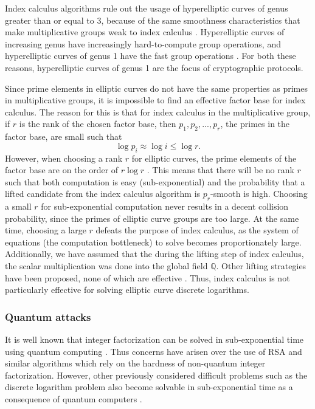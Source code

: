 \documentclass{article}
\begin{document}
    Index calculus algorithms rule out the usage of hyperelliptic curves of
    genus greater than or equal to 3, because of the same smoothness
    characteristics that make multiplicative groups weak to index calculus
    \cite{Theriault2003} \cite{Gaudry2000}. Hyperelliptic curves of increasing
    genus have increasingly hard-to-compute group operations, and hyperelliptic
    curves of genus 1 have the fast group operations \cite{Costello2012}. For
    both these reasons, hyperelliptic curves of genus 1 are the focus of
    cryptographic protocols.

    Since prime elements in elliptic curves do not have the same properties as
    primes in multiplicative groups, it is impossible to find an effective
    factor base for index calculus. The reason for this is that for index
    calculus in the multiplicative group, if $r$ is the rank of the chosen
    factor base, then $p_1, p_2, ..., p_r$, the primes in the factor base, are
    small such that
    \begin{equation}
        \log{p_i} \approx \log{i} \le \log{r}.
    \end{equation}
    However, when choosing a rank $r$ for elliptic curves, the prime elements
    of the factor base are on the order of $r\log{r}$ \cite{Silverman1998}.
    This means that there will be no rank $r$ such that both computation is
    easy (sub-exponential) and the probability that a lifted candidate from the
    index calculus algorithm is $p_r$-smooth is high. Choosing a small $r$ for
    sub-exponential computation never results in a decent collision
    probability, since the primes of elliptic curve groups are too large. At
    the same time, choosing a large $r$ defeats the purpose of index calculus,
    as the system of equations (the computation bottleneck) to solve becomes
    proportionately large.  Additionally, we have assumed that the during the
    lifting step of index calculus, the scalar multiplication was done into the
    global field $\mathbb{Q}$.  Other lifting strategies have been proposed,
    none of which are effective \cite{Silverman2009}. Thus, index calculus is
    not particularly effective for solving elliptic curve discrete logarithms. 


\subsubsection{Quantum attacks}
    It is well known that integer factorization can be solved in
    sub-exponential time using quantum computing \cite{quant_fac}
    \cite{shor_fac}. Thus concerns have arisen over the use of RSA and similar
    algorithms which rely on the hardness of non-quantum integer factorization.
    However, other previously considered difficult problems such as the
    discrete logarithm problem also become solvable in sub-exponential time as
    a consequence of quantum computers \cite{bern_quant}.
\end{document}
